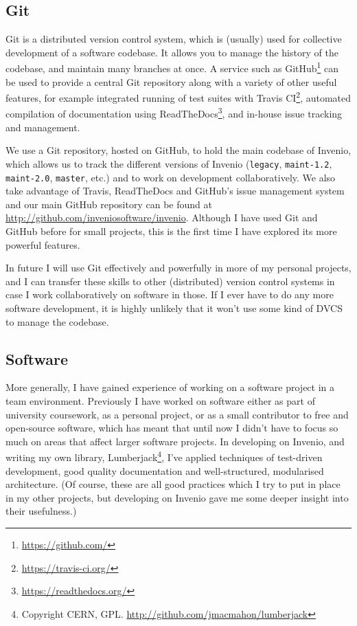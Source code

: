 \documentclass[a4paper,11pt]{article} %
\begin{document}
\subsection{Git}
\label{sec:technical.git}
Git is a distributed version control system, which is (usually) used for collective development of a software codebase.  It allows you to manage the history of the codebase, and maintain many branches at once.  A service such as GitHub\footnote{\url{https://github.com/}} can be used to provide a central Git repository along with a variety of other useful features, for example integrated running of test suites with Travis CI\footnote{\url{https://travis-ci.org/}}, automated compilation of documentation using ReadTheDocs\footnote{\url{https://readthedocs.org/}}, and in-house issue tracking and management.

We use a Git repository, hosted on GitHub, to hold the main codebase of Invenio, which allows us to track the different versions of Invenio (\texttt{legacy}, \texttt{maint-1.2}, \texttt{maint-2.0}, \texttt{master}, etc.) and to work on development collaboratively.  We also take advantage of Travis, ReadTheDocs and GitHub's issue management system and our main GitHub repository can be found at \url{http://github.com/inveniosoftware/invenio}.  Although I have used Git and GitHub before for small projects, this is the first time I have explored its more powerful features.

In future I will use Git effectively and powerfully in more of my personal projects, and I can transfer these skills to other (distributed) version control systems in case I work collaboratively on software in those.  If I ever have to do any more software development, it is highly unlikely that it won't use some kind of DVCS to manage the codebase.

\subsection{Software}
\label{sec:technical.software}
More generally, I have gained experience of working on a software project in a team environment.  Previously I have worked on software either as part of university coursework, as a personal project, or as a small contributor to free and open-source software, which has meant that until now I didn't have to focus so much on areas that affect larger software projects.  In developing on Invenio, and writing my own library, Lumberjack\footnote{Copyright CERN, GPL.  \url{http://github.com/jmacmahon/lumberjack}}, I've applied techniques of test-driven development, good quality documentation and well-structured, modularised architecture.  (Of course, these are all good practices which I try to put in place in my other projects, but developing on Invenio  gave me some deeper insight into their usefulness.)
\end{document}
